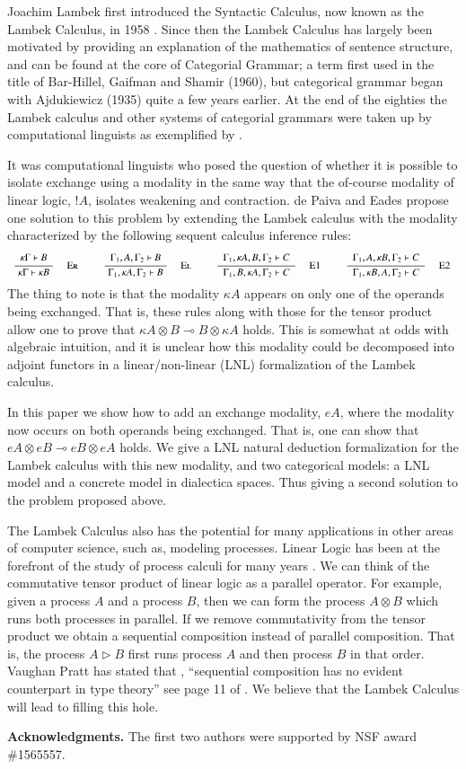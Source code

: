 Joachim Lambek first introduced the Syntactic Calculus, now known as
the Lambek Calculus, in 1958 \cite{Lambek1958}.  Since then the Lambek
Calculus has largely been motivated by providing an explanation of the
mathematics of sentence structure, and can be found at the core of
Categorial Grammar; a term first used in the title of Bar-Hillel,
Gaifman and Shamir (1960), but categorical grammar began with
Ajdukiewicz (1935) quite a few years earlier. At the end of the
eighties the Lambek calculus and other systems of categorial grammars
were taken up by computational linguists as exemplified by
\cite{oehrle2012categorial,moortgat1988categorial,Barry:1991:PFS:977180.977215,hepple1990grammar}.

It was computational linguists who posed the question of whether it is
possible to isolate exchange using a modality in the same way that the
of-course modality of linear logic, $!A$, isolates weakening and
contraction.  de Paiva and Eades \cite{dePaiva2018} propose one
solution to this problem by extending the Lambek calculus with the
modality characterized by the following sequent calculus inference
rules:
\[
\small
\begin{array}{ccccccccccccccccccccc}  
  {\displaystyle\frac{\begin{array}{l}   \kappa \Gamma \vdash \mathit{B}  \\ \end{array}}{ \kappa \Gamma \vdash \kappa \mathit{B} }\quad\textsc{ {\textsc{Er}}{} }} & & {\displaystyle\frac{\begin{array}{l}  \Gamma_{{\mathrm{1}}} , \mathit{A} , \Gamma_{{\mathrm{2}}} \vdash \mathit{B}  \\ \end{array}}{ \Gamma_{{\mathrm{1}}} , \kappa \mathit{A} , \Gamma_{{\mathrm{2}}} \vdash \mathit{B} }\quad\textsc{ {\textsc{El}}{} }} & & {\displaystyle\frac{\begin{array}{l}  \Gamma_{{\mathrm{1}}} , \kappa \mathit{A} , \mathit{B} , \Gamma_{{\mathrm{2}}} \vdash \mathit{C}  \\ \end{array}}{ \Gamma_{{\mathrm{1}}} , \mathit{B} , \kappa \mathit{A} , \Gamma_{{\mathrm{2}}} \vdash \mathit{C} }\quad\textsc{ {\textsc{E1}}{} }} & & {\displaystyle\frac{\begin{array}{l}  \Gamma_{{\mathrm{1}}} , \mathit{A} , \kappa \mathit{B} , \Gamma_{{\mathrm{2}}} \vdash \mathit{C}  \\ \end{array}}{ \Gamma_{{\mathrm{1}}} , \kappa \mathit{B} , \mathit{A} , \Gamma_{{\mathrm{2}}} \vdash \mathit{C} }\quad\textsc{ {\textsc{E2}}{} }} 
\end{array}
\]
The thing to note is that the modality $\kappa A$ appears on only one
of the operands being exchanged.  That is, these rules along with
those for the tensor product allow one to prove that $\kappa A \otimes
B \multimap B \otimes \kappa A$ holds.  This is somewhat at odds with
algebraic intuition, and it is unclear how this modality could be
decomposed into adjoint functors in a linear/non-linear (LNL)
formalization of the Lambek calculus.

In this paper we show how to add an exchange modality, $eA$, where the
modality now occurs on both operands being exchanged. That is, one can
show that $eA \otimes eB \multimap eB \otimes eA$ holds.  We give a
LNL natural deduction formalization for the Lambek calculus with this
new modality, and two categorical models: a LNL model and a concrete
model in dialectica spaces.  Thus giving a second solution to the
problem proposed above.

The Lambek Calculus also has the potential for many applications in
other areas of computer science, such as, modeling processes.  Linear
Logic has been at the forefront of the study of process calculi for
many years \cite{HONDA20102223,Pratt:1997,ABRAMSKY19945}. We can think
of the commutative tensor product of linear logic as a parallel
operator.  For example, given a process $A$ and a process $B$, then we
can form the process $A \otimes B$ which runs both processes in
parallel.  If we remove commutativity from the tensor product we
obtain a sequential composition instead of parallel composition.  That
is, the process $A \rhd B$ first runs process $A$ and then process $B$
in that order.  Vaughan Pratt has stated that , ``sequential
composition has no evident counterpart in type theory'' see page 11 of
\cite{Pratt:1997}.  We believe that the Lambek Calculus will lead to
filling this hole.  

\textbf{Acknowledgments.}  The first two authors were supported by NSF
award \#1565557.

